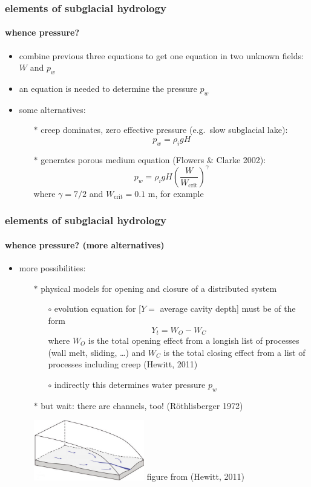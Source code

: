 \documentclass[hide notes,intlimits]{beamer}
\begin{document}
\begin{frame}
  \frametitle{elements of subglacial hydrology}
  \framesubtitle{whence pressure?}

  \begin{itemize}
    \item combine previous three equations to get one equation in two unknown fields: $W$ and $p_w$
    \item an equation is needed to determine the pressure $p_w$
    \item some alternatives:
      \begin{itemize}
      \item[$\ast$] creep dominates, zero effective pressure (e.g.~slow subglacial lake):
        $$p_w = \rho_i g H$$
      \item[$\ast$] generates porous medium equation (Flowers \& Clarke 2002):
        $$p_w = \rho_i g H \left(\frac{W}{W_{\text{crit}}}\right)^\gamma$$
        where $\gamma=7/2$ and $W_{\text{crit}}=0.1$ m, for example
      \end{itemize}
  \end{itemize}

\end{frame}


\begin{frame}
  \frametitle{elements of subglacial hydrology}
  \framesubtitle{whence pressure? (more alternatives)}

  \begin{itemize}
    \item more possibilities:
      \begin{itemize}
      \item[$\ast$] physical models for opening and closure of a distributed system
        \begin{itemize}
        \item[$\circ$]  evolution equation for [$Y=$ average cavity depth] must be of the form
        $$Y_t = W_O - W_C$$
where $W_O$ is the total opening effect from a longish list of processes (wall melt, sliding, \dots) and $W_C$ is the total closing effect from a list of processes including creep (Hewitt, 2011)
        \item[$\circ$] indirectly this determines water pressure $p_w$
        \end{itemize}
      \item[$\ast$] but wait: there are channels, too! (R\"othlisberger 1972)

\begin{center}
\medskip
\includegraphics[width=0.4\textwidth]{figs/hewitt-cartoon} \tiny figure from (Hewitt, 2011)
\medskip
\end{center}
    \end{itemize}
  \end{itemize}
\end{frame}
\end{document}
